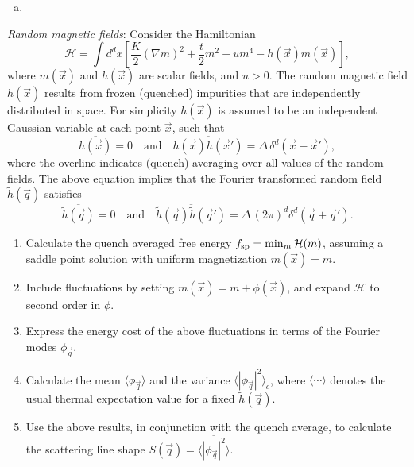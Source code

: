 \begin{solution}
    \begin{enumerate}[(a)]
        \item
    \end{enumerate}
\end{solution}

\begin{problem}
    \textit{Random magnetic fields}: Consider the Hamiltonian
    \[
        \mathcal{H} = \int d^dx\left[\frac{K}{2}(\nabla m)^2 + \frac{t}{2}m^2 + um^4 - h(\vec{x})m(\vec{x})\right],
    \]
    where $m(\vec{x})$ and $h(\vec{x})$ are scalar fields, and $u > 0$. The random magnetic field $h(\vec{x})$ results from frozen (quenched) impurities that are independently distributed in space. For simplicity $h(\vec{x})$ is assumed to be an independent Gaussian variable at each point $\vec{x}$, such that
    \[
        \overline{h(\vec{x})} = 0 \quad \text{and} \quad \overline{h(\vec{x})h(\vec{x}')} = \Delta\,\delta^d(\vec{x} - \vec{x}'),
    \]
    where the overline indicates (quench) averaging over all values of the random fields. The above equation implies that the Fourier transformed random field $\tilde{h}(\vec{q})$ satisfies
    \[
        \overline{\tilde{h}(\vec{q})} = 0 \quad \text{and} \quad \overline{\tilde{h}(\vec{q})\tilde{h}(\vec{q}')} = \Delta\,(2\pi)^d\delta^d(\vec{q}+\vec{q}').
    \]

    \begin{enumerate}
        \item[(a)] Calculate the quench averaged free energy $f_{\rm sp} = \min_m \mathcal{H}(m)$, assuming a saddle point solution with uniform magnetization $m(\vec{x}) = m$.

        \item[(b)] Include fluctuations by setting $m(\vec{x}) = m + \phi(\vec{x})$, and expand $\mathcal{H}$ to second order in $\phi$.

        \item[(c)] Express the energy cost of the above fluctuations in terms of the Fourier modes $\phi_{\vec{q}}$.

        \item[(d)] Calculate the mean $\langle\phi_{\vec{q}}\rangle$ and the variance $\langle|\phi_{\vec{q}}|^2\rangle_c$, where $\langle\cdots\rangle$ denotes the usual thermal expectation value for a fixed $\tilde{h}(\vec{q})$.

        \item[(e)] Use the above results, in conjunction with the quench average, to calculate the scattering line shape $S(\vec{q}) = \overline{\langle|\phi_{\vec{q}}|^2\rangle}$.


\end{enumerate}
\end{problem}
